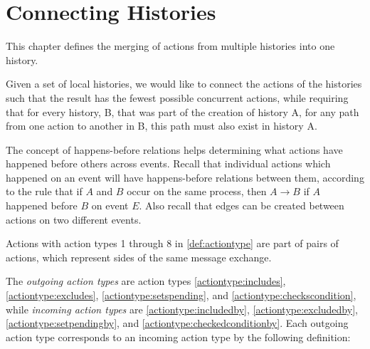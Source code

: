 \chapter{Connecting Histories} 
\label{chap:connecting-histories}
	This chapter defines the merging of actions from multiple histories into one history.
	
    \newpar
    Given a set of local histories, we would like to connect the actions of the histories such that the result has the fewest possible concurrent actions, while requiring that for every history, B, that was part of the creation of history A, for any path from one action to another in B, this path must also exist in history A.
    
    \newpar
    The concept of happens-before relations helps determining what actions have happened before others across events. Recall that individual actions which happened on an event will have happens-before relations between them, according to the rule that if $A$ and $B$ occur on the same process, then $A \rightarrow B$ if $A$ happened before $B$ on event $E$.
	Also recall that edges can be created between actions on two different events.
	
    \newpar
	Actions with action types 1 through 8 in \autoref{def:actiontype} are part of pairs of actions, which represent sides of the same message exchange.
	
	The \textit{outgoing action types} are action types \ref{actiontype:includes}, \ref{actiontype:excludes}, \ref{actiontype:setspending}, and \ref{actiontype:checkscondition}, while \textit{incoming action types} are \ref{actiontype:includedby}, \ref{actiontype:excludedby}, \ref{actiontype:setpendingby}, and \ref{actiontype:checkedconditionby}. Each outgoing action type corresponds to an incoming action type by the following definition:
	
